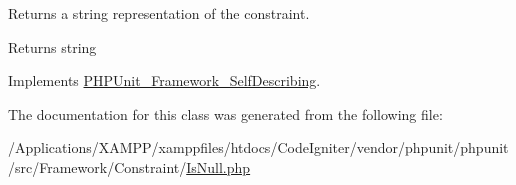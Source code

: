 Returns a string representation of the constraint.

\begin{DoxyReturn}{Returns}
string 
\end{DoxyReturn}


Implements \mbox{\hyperlink{interface_p_h_p_unit___framework___self_describing_a5558c5d549f41597377fa1ea8a1cefa3}{P\+H\+P\+Unit\+\_\+\+Framework\+\_\+\+Self\+Describing}}.



The documentation for this class was generated from the following file\+:\begin{DoxyCompactItemize}
\item 
/\+Applications/\+X\+A\+M\+P\+P/xamppfiles/htdocs/\+Code\+Igniter/vendor/phpunit/phpunit/src/\+Framework/\+Constraint/\mbox{\hyperlink{_is_null_8php}{Is\+Null.\+php}}\end{DoxyCompactItemize}
